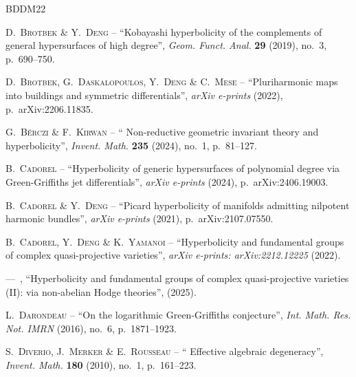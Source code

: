 \documentclass[11pt,english]{smfart}
\theoremstyle{plain}
\theoremstyle{definition}
\theoremstyle{remark}
\numberwithin{equation}{section}
\theoremstyle{plain}
\begin{document}
	
	\providecommand{\bysame}{\leavevmode ---\ }
	\providecommand{\og}{``}
	\providecommand{\fg}{''}
	\providecommand{\smfandname}{\&}
	\providecommand{\smfedsname}{\'eds.}
	\providecommand{\smfedname}{\'ed.}
	\providecommand{\smfmastersthesisname}{M\'emoire}
	\providecommand{\smfphdthesisname}{Th\`ese}
	\begin{thebibliography}{BDDM22}
		
		{\scshape D.~Brotbek {\normalfont \smfandname} Y.~Deng} -- {\og Kobayashi
			hyperbolicity of the complements of general hypersurfaces of high degree\fg},
		\emph{Geom. Funct. Anal.} \textbf{29} (2019), no.~3, p.~690--750.
		
		{\scshape D.~{Brotbek}, G.~{Daskalopoulos}, Y.~{Deng} {\normalfont \smfandname}
			C.~{Mese}} -- {\og {Pluriharmonic maps into buildings and symmetric
				differentials}\fg}, \emph{arXiv e-prints} (2022), p.~arXiv:2206.11835.
		
		{\scshape G.~B\'erczi {\normalfont \smfandname} F.~Kirwan} -- {\og
			Non-reductive geometric invariant theory and hyperbolicity\fg}, \emph{Invent.
			Math.} \textbf{235} (2024), no.~1, p.~81--127.
		
		{\scshape B.~{Cadorel}} -- {\og {Hyperbolicity of generic hypersurfaces of
				polynomial degree via Green-Griffiths jet differentials}\fg}, \emph{arXiv
			e-prints} (2024), p.~arXiv:2406.19003.
		
		{\scshape B.~{Cadorel} {\normalfont \smfandname} Y.~{Deng}} -- {\og {Picard
				hyperbolicity of manifolds admitting nilpotent harmonic bundles}\fg},
		\emph{arXiv e-prints} (2021), p.~arXiv:2107.07550.
		
		{\scshape B.~{Cadorel}, Y.~{Deng} {\normalfont \smfandname} K.~{Yamanoi}} --
		{\og {Hyperbolicity and fundamental groups of complex quasi-projective
				varieties}\fg}, \emph{arXiv e-prints: arXiv:2212.12225} (2022).
		
		\bysame , {\og {Hyperbolicity and fundamental groups of complex
				quasi-projective varieties (II): via non-abelian Hodge theories}\fg},
		(2025).
		
		{\scshape L.~Darondeau} -- {\og On the logarithmic {G}reen-{G}riffiths
			conjecture\fg}, \emph{Int. Math. Res. Not. IMRN} (2016), no.~6,
		p.~1871--1923.
		
		{\scshape S.~Diverio, J.~Merker {\normalfont \smfandname} E.~Rousseau} -- {\og
			Effective algebraic degeneracy\fg}, \emph{Invent. Math.} \textbf{180} (2010),
		no.~1, p.~161--223.
		

\end{thebibliography}
\end{document}
